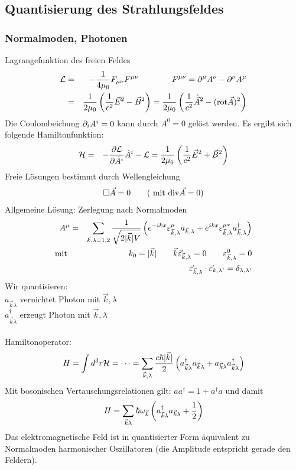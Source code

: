 \subsection{Quantisierung des Strahlungsfeldes}
\subsubsection{Normalmoden, Photonen}
Lagrangefunktion des freien Feldes
\begin{eqnarray*}\mathcal L &=& -\frac 1 {4\mu_0} F_{\mu\nu}F^{\mu\nu}\qquad\qquad F^{\mu\nu} = \partial^{\mu}A^{\nu}- \partial^{\nu}A^{\mu}\\
&=& \frac 1 {2 \mu_0}\left(\frac 1 {c^2}\vec E^2 - \vec B^2\right) = \frac 1 {2 \mu_0}\left(\frac 1 {c^2}\dot{\vec A}^2- (\text{rot}\vec A)^2 \right)
\end{eqnarray*}
Die Coulombeichung $\partial_i A^i = 0$ kann durch $A^0=0$ gelöst werden. Es ergibt sich folgende Hamiltonfunktion: 
\begin{eqnarray*}
\mathcal H &=& -\frac{\partial \mathcal L}{\partial \dot A^i}\dot A^i-\mathcal L =\frac 1 {2\mu_0}\left(\frac 1 {c^2}\vec E^2+\vec B^2\right)
\end{eqnarray*}
Freie Lösungen bestimmt durch Wellengleichung
\begin{eqnarray*}
	\Box \vec A = 0\qquad (\text{ mit }\text{div} \vec A = 0) 
\end{eqnarray*}
Allgemeine Lösung: Zerlegung nach Normalmoden
\begin{eqnarray*}
A^\mu &=& \sum \limits_{\vec k,\lambda=1 ,2} \frac 1 {\sqrt{2 |\vec k|V}}\left(e^{-ikx} \varepsilon ^\mu_{\vec k,\lambda} a_{\vec k,\lambda} + e^{ikx}\varepsilon^{\mu *}_{\vec k,\lambda} a^\dagger_{\vec k,\lambda}\right)\\
\text{mit }&{}&k_0 = |\vec k|\qquad \vec k\vec \varepsilon_{\vec k,\lambda} = 0\qquad \varepsilon^0_{\vec k,\lambda} = 0\\
&{}&\vec \varepsilon_{\vec k,\lambda} \cdot \vec\varepsilon_{k,\lambda'} = \delta_{\lambda,\lambda'}
\end{eqnarray*}
Wir quantisieren:\\
$a_{\vec k\lambda}$ vernichtet Photon mit $\vec k, \lambda$\\
$a_{\vec k\lambda}^\dagger$ erzeugt Photon mit $\vec k, \lambda$\\ \\
Hamiltonoperator:
\begin{eqnarray*}
H = \int d^3 r\mathcal H = \dots = \sum_{\vec k, \lambda} \frac{c\hbar|\vec k|}2 \left(a^\dagger_{\vec k \lambda}a_{\vec k \lambda}+a_{\vec k \lambda}a_{\vec k \lambda}^\dagger \right)
\end{eqnarray*}
Mit bosonischen Vertauschungsrelationen gilt: $aa^\dagger = 1 + a^\dagger a $ und damit
\begin{eqnarray*} 
	H = \sum \limits_{\vec k \lambda}\hbar \omega_{\vec k}\left(a_{\vec k \lambda}^\dagger a_{\vec k \lambda}+\frac 1 2\right)
\end{eqnarray*}
Das elektromagnetische Feld ist in quantisierter Form äquivalent zu Normalmoden harmonischer Oszillatoren (die Amplitude entspricht gerade den Feldern).

